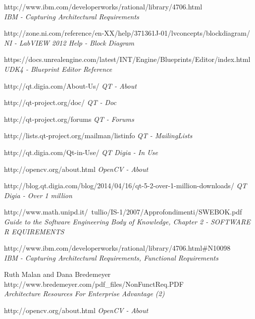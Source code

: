 \documentclass[a4paper,12pt,oneside]{report}
\begin{document}
\begin{thebibliography}{99}
        http://www.ibm.com/developerworks/rational/library/4706.html\\
        {\em IBM - Capturing Architectural Requirements}  


		http://zone.ni.com/reference/en-XX/help/371361J-01/lvconcepts/blockdiagram/\\
        {\em NI - LabVIEW 2012 Help - Block Diagram}  

		https://docs.unrealengine.com/latest/INT/Engine/Blueprints/Editor/index.html\\
        {\em UDK4 - Blueprint Editor Reference}  


		http://qt.digia.com/About-Us/
        {\em QT - About } 
 
        http://qt-project.org/doc/
        {\em QT - Doc} 
         
        http://qt-project.org/forums
        {\em QT - Forums}        

          http://lists.qt-project.org/mailman/listinfo 
        {\em QT - MailingLists}        


        http://qt.digia.com/Qt-in-Use/
        {\em QT Digia - In Use}  
        
        
        http://opencv.org/about.html
        {\em OpenCV - About}  
        
        
		http://blog.qt.digia.com/blog/2014/04/16/qt-5-2-over-1-million-downloads/
        {\em QT Digia - Over 1 million}  
        
        http://www.math.unipd.it/~tullio/IS-1/2007/Approfondimenti/SWEBOK.pdf\\
        {\em Guide to the Software Engineering Body of Knowledge, Chapter 2 - SOFTWARE R EQUIREMENTS}
        
        
		http://www.ibm.com/developerworks/rational/library/4706.html\#N10098 \\
        {\em IBM - Capturing Architectural Requirements, Functional Requirements }
        
		Ruth Malan and Dana Bredemeyer
		http://www.bredemeyer.com/pdf\_files/NonFunctReq.PDF \\
        {\em Architecture Resources For Enterprise Advantage (2)\\}
        

        http://opencv.org/about.html
        {\em OpenCV - About}  




\end{thebibliography}
\end{document}
